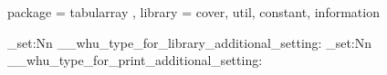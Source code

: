 \WHUDependency 
  {
    package = { tabularray },
    library = { cover, util, constant, information }
  }

\cs_set:Nn \__whu_type_for_library_additional_setting:
  {
    \AtBeginDocument
      { \hypersetup { allcolors = black } }
  }
\cs_set:Nn \__whu_type_for_print_additional_setting:
  {
    \AtBeginDocument
      { \hypersetup { allcolors = black } }
  }





